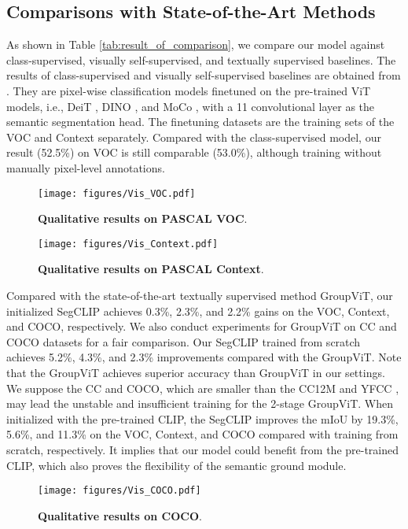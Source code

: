 \documentclass{article}
\theoremstyle{plain}
\theoremstyle{definition}
\theoremstyle{remark}
\begin{document}
\subsection{Comparisons with State-of-the-Art Methods}
As shown in Table \ref{tab:result_of_comparison}, we compare our model against class-supervised, visually self-supervised, and textually supervised baselines. The results of class-supervised and visually self-supervised baselines are obtained from \cite{Xu2022GroupViT}. They are pixel-wise classification models finetuned on the pre-trained ViT models, i.e., DeiT \cite{Touvron2021Training}, DINO \cite{Caron2021Emerging}, and MoCo \cite{Chen2021An}, with a 11 convolutional layer as the semantic segmentation head. The finetuning datasets are the training sets of the VOC and Context separately. Compared with the class-supervised model, our result (52.5\%) on VOC is still comparable (53.0\%), although training without manually pixel-level annotations. 
\begin{figure}[tp]
    \centering
    \texttt{[image: figures/Vis\_VOC.pdf]}
    \caption{\textbf{Qualitative results on PASCAL VOC}.}
    \label{fig:qualitative_results_voc}
\end{figure}
\begin{figure}[tp]
    \centering 
    \texttt{[image: figures/Vis\_Context.pdf]}
    \caption{\textbf{Qualitative results on PASCAL Context}.}
    \label{fig:qualitative_results_context}
\end{figure}

Compared with the state-of-the-art textually supervised method GroupViT, our initialized SegCLIP achieves 0.3\%, 2.3\%, and 2.2\% gains on the VOC, Context, and COCO, respectively. We also conduct experiments for GroupViT on CC and COCO datasets for a fair comparison. Our SegCLIP trained from scratch achieves 5.2\%, 4.3\%, and 2.3\% improvements compared with the GroupViT. Note that the GroupViT achieves superior accuracy than GroupViT in our settings. We suppose the CC and COCO, which are smaller than the CC12M \cite{Changpinyo2021CC12M} and YFCC \cite{Thomee2016YFCC100M}, may lead the unstable and insufficient training for the 2-stage GroupViT. When initialized with the pre-trained CLIP, the SegCLIP improves the mIoU by 19.3\%, 5.6\%, and 11.3\% on the VOC, Context, and COCO compared with training from scratch, respectively. It implies that our model could benefit from the pre-trained CLIP, which also proves the flexibility of the semantic ground module.
\begin{figure}[tp]
    \centering
    \texttt{[image: figures/Vis\_COCO.pdf]}
    \caption{\textbf{Qualitative results on COCO}.}
    \label{fig:qualitative_results_coco}
\end{figure}
\end{document}
